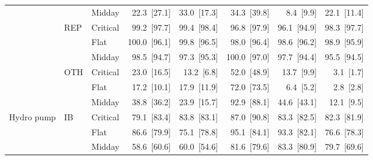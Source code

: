 \begin{tabular}{l l l r r r r r}
 &  & Midday & 22.3~{\color{seasoncol}\scriptsize[27.1]} & 33.0~{\color{seasoncol}\scriptsize[17.3]} & 34.3~{\color{seasoncol}\scriptsize[39.8]} & 8.4~{\color{seasoncol}\scriptsize[9.9]} & 22.1~{\color{seasoncol}\scriptsize[11.4]} \\
 & REP & Critical & 99.2~{\color{seasoncol}\scriptsize[97.7]} & 99.4~{\color{seasoncol}\scriptsize[98.4]} & 96.8~{\color{seasoncol}\scriptsize[97.9]} & 96.1~{\color{seasoncol}\scriptsize[94.9]} & 98.3~{\color{seasoncol}\scriptsize[97.7]} \\
 &  & Flat & 100.0~{\color{seasoncol}\scriptsize[96.1]} & 99.8~{\color{seasoncol}\scriptsize[96.5]} & 98.0~{\color{seasoncol}\scriptsize[96.4]} & 98.6~{\color{seasoncol}\scriptsize[96.2]} & 98.9~{\color{seasoncol}\scriptsize[95.9]} \\
 &  & Midday & 98.5~{\color{seasoncol}\scriptsize[94.7]} & 97.3~{\color{seasoncol}\scriptsize[95.3]} & 100.0~{\color{seasoncol}\scriptsize[97.0]} & 97.7~{\color{seasoncol}\scriptsize[94.4]} & 95.5~{\color{seasoncol}\scriptsize[94.5]} \\
 & OTH & Critical & 23.0~{\color{seasoncol}\scriptsize[16.5]} & 13.2~{\color{seasoncol}\scriptsize[6.8]} & 52.0~{\color{seasoncol}\scriptsize[48.9]} & 13.7~{\color{seasoncol}\scriptsize[9.9]} & 3.1~{\color{seasoncol}\scriptsize[1.7]} \\
 &  & Flat & 17.2~{\color{seasoncol}\scriptsize[10.1]} & 17.9~{\color{seasoncol}\scriptsize[11.9]} & 72.0~{\color{seasoncol}\scriptsize[73.5]} & 6.4~{\color{seasoncol}\scriptsize[5.2]} & 2.8~{\color{seasoncol}\scriptsize[2.8]} \\
 &  & Midday & 38.8~{\color{seasoncol}\scriptsize[36.2]} & 23.9~{\color{seasoncol}\scriptsize[15.7]} & 92.9~{\color{seasoncol}\scriptsize[88.1]} & 44.6~{\color{seasoncol}\scriptsize[43.1]} & 12.1~{\color{seasoncol}\scriptsize[9.5]} \\
\addlinespace
Hydro pump & IB & Critical & 79.1~{\color{seasoncol}\scriptsize[83.4]} & 83.8~{\color{seasoncol}\scriptsize[83.1]} & 87.0~{\color{seasoncol}\scriptsize[90.8]} & 83.3~{\color{seasoncol}\scriptsize[82.5]} & 82.3~{\color{seasoncol}\scriptsize[81.9]} \\
 &  & Flat & 86.6~{\color{seasoncol}\scriptsize[79.9]} & 75.1~{\color{seasoncol}\scriptsize[78.8]} & 95.1~{\color{seasoncol}\scriptsize[84.1]} & 93.3~{\color{seasoncol}\scriptsize[82.1]} & 76.6~{\color{seasoncol}\scriptsize[78.3]} \\
 &  & Midday & 58.6~{\color{seasoncol}\scriptsize[60.6]} & 60.0~{\color{seasoncol}\scriptsize[54.6]} & 81.6~{\color{seasoncol}\scriptsize[79.6]} & 83.3~{\color{seasoncol}\scriptsize[80.9]} & 79.7~{\color{seasoncol}\scriptsize[69.6]} \\

\end{tabular}

